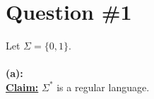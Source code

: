 \documentclass[12pt]{article}
\begin{document}
\renewcommand{\familydefault}{\rmdefault}



\pagebreak
\normalsize

\section*{Question \#1}
Let $\Sigma = \{ 0, 1 \} $. \\
\\
\textbf{(a):} \\
\textbf{\underline{Claim:}} $\Sigma^*$ is a regular language.
\end{document}
